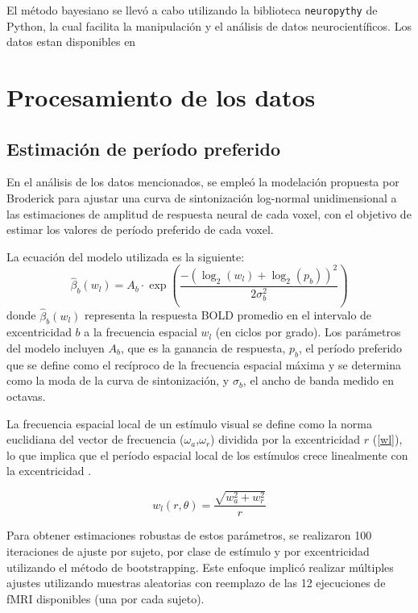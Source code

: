 El método bayesiano se llevó a cabo utilizando la biblioteca \texttt{neuropythy} de Python, la cual facilita la manipulación y el análisis de datos neurocientíficos. Los datos estan disponibles en 


\section{Procesamiento de los datos}

\subsection{Estimaci\'on de per\'iodo preferido}

En el análisis de los datos mencionados, se empleó la modelación propuesta por Broderick para ajustar una curva de sintonización log-normal unidimensional a las estimaciones de amplitud de respuesta neural de cada voxel, con el objetivo de estimar los valores de período preferido de cada voxel.

La ecuación del modelo utilizada es la siguiente:
\begin{equation}
\hat{\beta}_b(w_l) = A_b \cdot \exp\left(\frac{-(\log_2(w_l) + \log_2(p_b))^2}{2\sigma_b^2}\right)
\end{equation}
donde \(\hat{\beta}_b(w_l)\) representa la respuesta BOLD promedio en el intervalo de excentricidad \(b\) a la frecuencia espacial \(w_l\) (en ciclos por grado). Los parámetros del modelo incluyen \(A_b\), que es la ganancia de respuesta, \(p_b\), el período preferido que se define como el recíproco de la frecuencia espacial máxima y se determina como la moda de la curva de sintonización, y \(\sigma_b\), el ancho de banda medido en octavas.

La frecuencia espacial local de un est\'imulo visual se define como la norma euclidiana del vector de frecuencia ($\omega_a$,$\omega_r$) dividida por la excentricidad  $r$ (\ref{wl}), lo que implica que el período espacial local de los estímulos crece linealmente con la excentricidad .

\begin{equation}
	w_l(r,\theta) = \dfrac{\sqrt{w_a^2 + w_r^2}}{r} 
	\label{wl}
\end{equation}

Para obtener estimaciones robustas de estos parámetros, se realizaron 100 iteraciones de ajuste por sujeto, por clase de estímulo y por excentricidad utilizando el método de bootstrapping. Este enfoque implicó realizar múltiples ajustes utilizando muestras aleatorias con reemplazo de las 12 ejecuciones de fMRI disponibles (una por cada sujeto).

